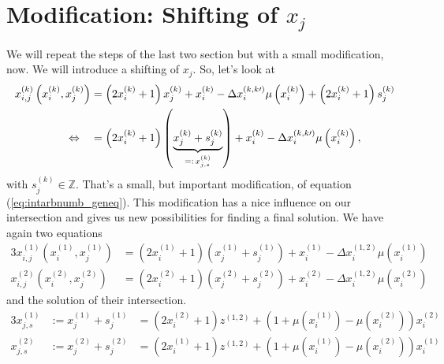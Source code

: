 \section{Modification: Shifting of $x_{j}$}
\label{s:modshiftingxj}
We will repeat the steps of the last two section but with a small modification, now. We will introduce a shifting of $x_{j}$. So, let's look at
\begin{alignat}{3}
	x_{i,j}^{\left(k\right)}\left(x_{i}^{\left(k\right)}, x_{j}^{\left(k\right)}\right) &= \left(2x_{i}^{\left(k\right)} + 1\right)x_{j}^{\left(k\right)} + x_{i}^{\left(k\right)} - \Delta x_{i}^{\left(k,k\prime\right)}\mu\left(x_{i}^{\left(k\right)}\right) + \left(2x_{i}^{\left(k\right)} + 1\right)s_{j}^{\left(k\right)} \notag \\
	\Leftrightarrow \quad &= \left(2x_{i}^{\left(k\right)} + 1\right)\left(\underbrace{x_{j}^{\left(k\right)} + s_{j}^{\left(k\right)}}_{=: \, x_{j,s}^{\left(k\right)}}\right) + x_{i}^{\left(k\right)} - \Delta x_{i}^{\left(k,k\prime\right)}\mu\left(x_{i}^{\left(k\right)}\right), \label{eq:intarbnumb_geneq_shift}
\end{alignat}
with $s_{j}^{\left(k\right)} \in \mathbb{Z}$. That's a small, but important modification, of equation (\ref{eq:intarbnumb_geneq}). This modification has a nice influence on our intersection and gives us new possibilities for finding a final solution. We have again two equations
\begin{alignat}{3}
	x_{i,j}^{\left(1\right)}\left(x_{i}^{\left(1\right)}, x_{j}^{\left(1\right)}\right) &= \left(2x_{i}^{\left(1\right)} + 1\right)\left(x_{j}^{\left(1\right)} + s_{j}^{\left(1\right)}\right) + x_{i}^{\left(1\right)} - \Delta x_{i}^{\left(1,2\right)}\mu\left(x_{i}^{\left(1\right)}\right) \label{eq:eq1_shifted} \\
	x_{i,j}^{\left(2\right)}\left(x_{i}^{\left(2\right)}, x_{j}^{\left(2\right)}\right) &= \left(2x_{i}^{\left(2\right)} + 1\right)\left(x_{j}^{\left(2\right)} + s_{j}^{\left(2\right)}\right) + x_{i}^{\left(2\right)} - \Delta x_{i}^{\left(1,2\right)}\mu\left(x_{i}^{\left(2\right)}\right) \label{eq:eq2_shifted}
\end{alignat}
and the solution of their intersection.
\begin{alignat}{3}
	x_{j,s}^{\left(1\right)} &:= x_{j}^{\left(1\right)} + s_{j}^{\left(1\right)} &= \left(2x_{i}^{\left(2\right)} + 1\right)z^{\left(1,2\right)} + \left(1 + \mu\left(x_{i}^{\left(1\right)}\right) - \mu\left(x_{i}^{\left(2\right)}\right)\right)x_{i}^{\left(2\right)} \label{eq:step1_sol_xj1_shifted} \\
	x_{j,s}^{\left(2\right)} &:= x_{j}^{\left(2\right)} + s_{j}^{\left(2\right)} &= \left(2x_{i}^{\left(1\right)} + 1\right)z^{\left(1,2\right)} + \left(1 + \mu\left(x_{i}^{\left(1\right)}\right) - \mu\left(x_{i}^{\left(2\right)}\right)\right)x_{i}^{\left(1\right)} \label{eq:step1_sol_xj2_shifted}
\end{alignat}
